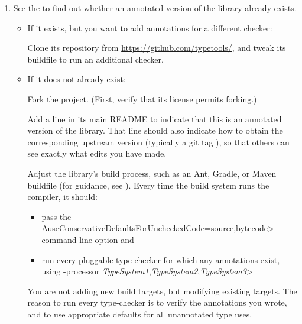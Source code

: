 \begin{enumerate}
\item See the
  to find out whether an annotated version of the library already exists.

  \begin{itemize}
  \item
    If it exists, but you want to add annotations for a different checker:

    Clone its repository from \url{https://github.com/typetools/}, and tweak
    its buildfile to run an additional checker.

  \item
    If it does not already exist:

    Fork the project.  (First, verify that its license permits forking.)

    Add a line in its main README to indicate that this is an annotated
    version of the library.  That line should also indicate how to obtain
    the corresponding upstream version (typically a git tag
    ), so that others can see exactly what edits you have
    made.

  Adjust the library's
  build process, such as an Ant, Gradle, or Maven buildfile (for guidance,
  see ).
    Every time the build system runs the compiler, it should:
    \begin{itemize}
    \item
      pass the \<-AuseConservativeDefaultsForUncheckedCode=source,bytecode>
      command-line option and
    \item
      run every pluggable type-checker for which any
      annotations exist, using \<-processor
      \emph{TypeSystem1},\emph{TypeSystem2},\emph{TypeSystem3}>
    \end{itemize}

  You are not adding new build targets, but modifying existing targets.
  The reason to run every type-checker is to verify
  the annotations you wrote, and to use appropriate defaults for all
  unannotated type uses.
  \end{itemize}


\end{enumerate}

